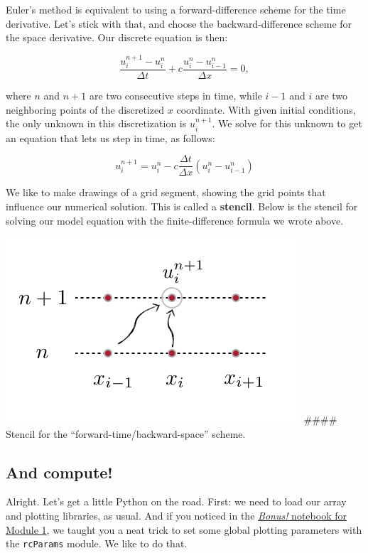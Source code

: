 \documentclass{article}
\begin{document}
Euler's method is equivalent to using a forward-difference scheme for
the time derivative. Let's stick with that, and choose the
backward-difference scheme for the space derivative. Our discrete
equation is then:

\begin{equation}\frac{u_i^{n+1}-u_i^n}{\Delta t} + c \frac{u_i^n - u_{i-1}^n}{\Delta x} = 0, \end{equation}

where \(n\) and \(n+1\) are two consecutive steps in time, while \(i-1\)
and \(i\) are two neighboring points of the discretized \(x\)
coordinate. With given initial conditions, the only unknown in this
discretization is \(u_i^{n+1}\). We solve for this unknown to get an
equation that lets us step in time, as follows:

\begin{equation}u_i^{n+1} = u_i^n - c \frac{\Delta t}{\Delta x}(u_i^n-u_{i-1}^n)\end{equation}

We like to make drawings of a grid segment, showing the grid points that
influence our numerical solution. This is called a \textbf{stencil}.
Below is the stencil for solving our model equation with the
finite-difference formula we wrote above.

    \includegraphics{figures/FTBS_stencil.png} \#\#\#\# Stencil for the
``forward-time/backward-space'' scheme.

    \subsection{And compute!}\label{and-compute}

    Alright. Let's get a little Python on the road. First: we need to load
our array and plotting libraries, as usual. And if you noticed in the
\href{http://nbviewer.ipython.org/github/numerical-mooc/numerical-mooc/blob/master/lessons/01_phugoid/01_04_Second_Order_Methods.ipynb}{\emph{Bonus!}
notebook for Module 1}, we taught you a neat trick to set some global
plotting parameters with the \texttt{rcParams} module. We like to do
that.
\end{document}
